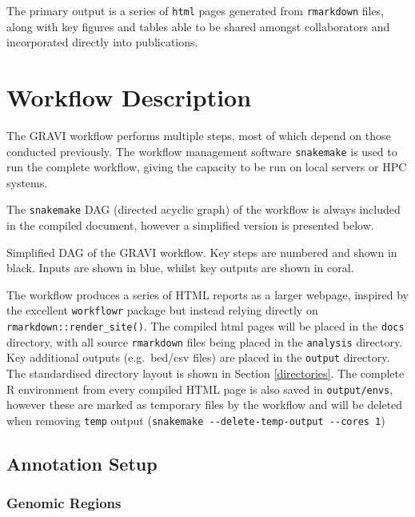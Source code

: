 \documentclass[
]{book}
\begin{document}
The primary output is a series of \texttt{html} pages generated from \texttt{rmarkdown} files, along with key figures and tables able to be shared amongst collaborators and incorporated directly into publications.

\hypertarget{workflow}{%
\chapter{Workflow Description}\label{workflow}}

The GRAVI workflow performs multiple steps, most of which depend on those conducted previously.
The workflow management software \texttt{snakemake}\citep{snakemake} is used to run the complete workflow, giving the capacity to be run on local servers or HPC systems.

The \texttt{snakemake} DAG (directed acyclic graph) of the workflow is always included in the compiled document, however a simplified version is presented below.

\label{fig:unnamed-chunk-3}Simplified DAG of the GRAVI workflow. Key steps are numbered and shown in black. Inputs are shown in blue, whilst key outputs are shown in coral.

The workflow produces a series of HTML reports as a larger webpage, inspired by the excellent \texttt{workflowr}\citep{workflowr} package but instead relying directly on \texttt{rmarkdown::render\_site()}\citep{R-rmarkdown}.
The compiled html pages will be placed in the \texttt{docs} directory, with all source \texttt{rmarkdown} files being placed in the \texttt{analysis} directory.
Key additional outputs (e.g.~bed/csv files) are placed in the \texttt{output} directory.
The standardised directory layout is shown in Section \ref{directories}.
The complete R environment from every compiled HTML page is also saved in \texttt{output/envs}, however these are marked as temporary files by the workflow and will be deleted when removing \texttt{temp} output (\texttt{snakemake\ -\/-delete-temp-output\ -\/-cores\ 1})

\hypertarget{annotation}{%
\section{Annotation Setup}\label{annotation}}

\hypertarget{genomic-regions}{%
\subsection*{Genomic Regions}\label{genomic-regions}}
\end{document}
